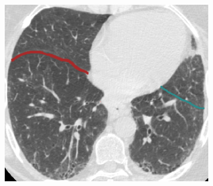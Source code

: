 {\begin{figure}[htbp]
\begin{subfigure}{.32\linewidth}
  \caption{}
  \label{fig:IPFSegmentationResults-e} 
\end{subfigure}
\begin{subfigure}{.32\linewidth}%
  \includegraphics[width=\linewidth,trim={{.0\wd0} {.0\wd0} {.0\wd0} {.0\wd0}},clip]{Segmentation/Image/IPF203_FinalResult_Axial125.png}

\end{subfigure}
\end{figure}}
